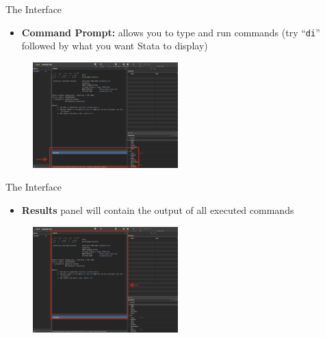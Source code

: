\documentclass[11pt,notes=hide,aspectratio=169,mathserif]{beamer}
\begin{document}
\begin{frame}{The Interface}
\begin{itemize}
\item \textbf{Command Prompt:} allows you to type and run commands (try ``\texttt{di}'' followed by what you want Stata to display)
\end{itemize}
\begin{figure}
    \centering
    \includegraphics[width=0.5\textwidth]{inputs/ta1_result_window2.png}
\end{figure}
\end{frame}

\begin{frame}{The Interface}
\begin{itemize}
\item \textbf{Results} panel will contain the output of all executed commands
\end{itemize}
\begin{figure}
    \centering
    \includegraphics[width=0.5\textwidth]{inputs/ta1_result_window3.png}
\end{figure}
\end{frame}
\end{document}

